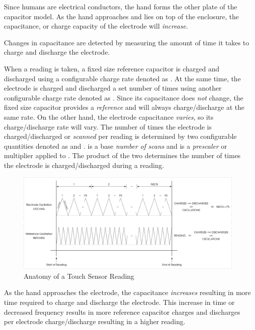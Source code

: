 Since humans are electrical conductors, the hand forms the other plate of the
capacitor model.  As the hand approaches and lies on top of the enclosure, the
capacitance, or charge capacity of the electrode will \textit{increase}.

\par\medskip

Changes in capacitance are detected by measuring the amount of time it takes to
charge and discharge the electrode.

\par\medskip

When a reading is taken, a fixed size reference capacitor is charged and
discharged using a configurable charge rate denoted as .  At the same
time, the electrode is charged and discharged a set number of times using
another configurable charge rate denoted as .  Since its capacitance
does \textit{not} change, the fixed size capacitor provides a \textit{reference} and will
always charge\slash discharge at the same rate.  On the other hand, the
electrode capacitance \textit{varies}, so its charge\slash discharge rate will
vary.  The number of times the electrode is charged\slash discharged or
\textit{scanned} per reading is determined by two configurable quantities
denoted as  and .   is a base
\textit{number of scans} and  is a \textit{prescaler} or multiplier
applied to .  The product of the two determines the number of times the
electrode is charged\slash discharged during a reading.

\begin{figure}[H]
\centering
  \includegraphics{images/touch_oscillation_graph.png}
\caption{Anatomy of a Touch Sensor Reading}
\end{figure}

As the hand approaches the electrode, the capacitance \textit{increases} resulting in
more time required to charge and discharge the electrode.  This increase in time
or decreased frequency results in more reference capacitor charges and
discharges per electrode charge\slash discharge resulting in a higher reading.


